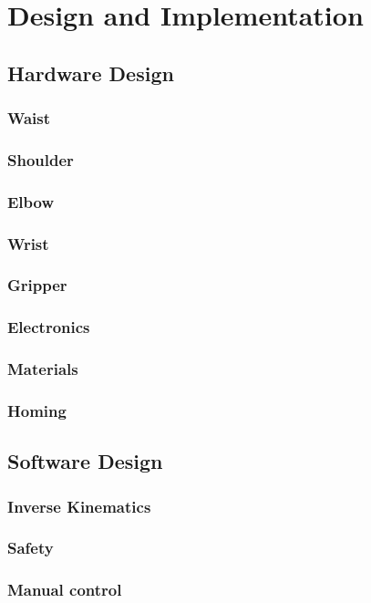 \section{Design and Implementation}

\subsection{Hardware Design}
\subsubsection{Waist}
\subsubsection{Shoulder}
\subsubsection{Elbow}
\subsubsection{Wrist}
\subsubsection{Gripper}
\subsubsection{Electronics}
\subsubsection{Materials}
\subsubsection{Homing}


\subsection{Software Design}
\subsubsection{Inverse Kinematics}
\subsubsection{Safety}
\subsubsection{Manual control}


